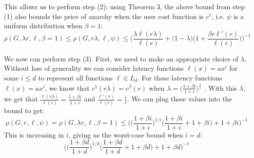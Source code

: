 \begin{proof-sketch}
    This allows us to perform step (2): using Theorem 3, the above bound from step (1) also bounds the price of anarchy when the user cost function is $c^1$, i.e. $\psi$ is a uniform distribution when $\beta = 1$:
    $$\rho(G,\lambda r,\ell,\beta=1) \le \rho(G,r\lambda, \ell, \psi) \le \Big(\frac{\lambda \ell(r\lambda)}{\ell(r)} + \Big(1-\lambda\Big)\Big(1+\frac{\beta r\ell'(r)}{\ell(r)}\Big)\Big)^{-1}$$

    We now can perform step (3). First, we need to make an appropriate choice of $\lambda$. Without loss of generality we can consider latency functions  $\ell(x) = ax^i$ for some $i \le d$ to represent all functions $\ell \in L_d$. For these latency functions $\ell(x) = ax^i$, we know that 
    $c^1(r\lambda) = c^\beta(r)$ when $\lambda = \Big(\frac{1+\beta i}{1+i}\Big)^{\frac{1}{i}}$ .
    With this $\lambda$, we get that $\frac{\ell(r\lambda)}{\ell(r)} = \frac{1+\beta i}{1+i}$ and $\frac{\ell'(r)}{\ell(r)} = \frac{i}{r}$. We can plug these values into the bound to get:
    $$\rho(G,r,\ell,\psi) = \rho(G,\lambda r, \ell,\beta=1) \le \Big(\Big(\frac{1+\beta i}{1+i}\Big)^{1/i}\Big(\frac{1+\beta i}{1+i} + 1 + \beta i\Big)+ 1 + \beta i\Big)^{-1}$$
    This is increasing in $i$, giving us the worst-case bound when $i=d$:
$$\Big(\Big(\frac{1+\beta d}{1+d}\Big)^{1/d}\Big(\frac{1+\beta d}{1+d} + 1 + \beta d\Big)+ 1 + \beta d\Big)^{-1}$$
\end{proof-sketch}

